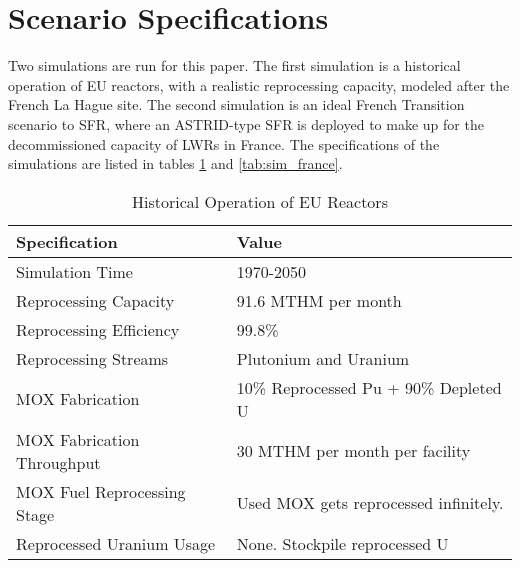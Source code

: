 \section{Scenario Specifications}

Two simulations are run for this paper.
The first simulation is a historical operation of \gls{EU} reactors, with a
realistic reprocessing capacity, modeled after the French La Hague site.
The second simulation is an ideal French Transition scenario to \gls{SFR},
where an ASTRID-type \gls{SFR} is deployed to make up for the decommissioned
capacity of \glspl{LWR} in France. The specifications of the simulations
are listed in tables \ref{tab:sim_eu} and \ref{tab:sim_france}.

\begin{table}[h]
	\centering
	\begin{tabularx}{\textwidth}{bb}
		\hline
		Specification & Value \\
		\hline
		Simulation Time & 1970-2050 \\ 
		Reprocessing Capacity & 91.6 MTHM per month \cite{schneider_spent_2008} \\
		Reprocessing Efficiency & 99.8\% \\
		Reprocessing Streams & Plutonium and Uranium \\
		\gls{MOX} Fabrication & \small{10\% Reprocessed Pu + 90\% Depleted U} \\
		\gls{MOX} Fabrication Throughput & 30 MTHM per month per facility \cite{hugelmann_melox_1999} \\
		\gls{MOX} Fuel Reprocessing Stage &  Used \gls{MOX} gets reprocessed infinitely. \\  
		Reprocessed Uranium Usage &  None. Stockpile reprocessed U \\
		\hline
	\end{tabularx}
	\caption {Historical Operation of \gls{EU} Reactors}
	\label{tab:sim_eu}
\end{table}

